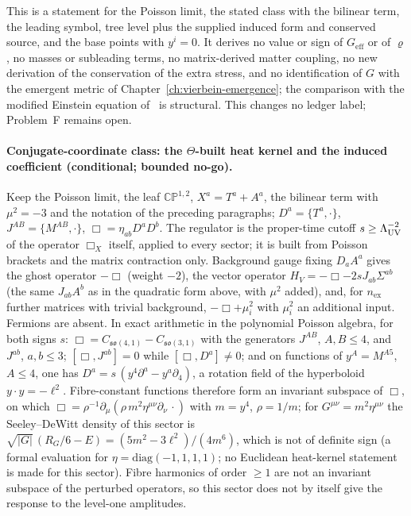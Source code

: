 This is a statement for the Poisson limit, the stated class with the bilinear term, the leading symbol, tree level plus the supplied induced form and conserved source, and the base points with \(y^i=0\). It derives no value or sign of \(G_{\mathrm{eff}}\) or of \(\varrho\), no masses or subleading terms, no matrix-derived matter coupling, no new derivation of the conservation of the extra stress, and no identification of \(G\) with the emergent metric of Chapter~\ref{ch:vierbein-emergence}; the comparison with the modified Einstein equation of~\cite{KumarSteinacker2023,Steinacker2026} is structural. This changes no ledger label; Problem~F remains open.

\paragraph{Conjugate-coordinate class: the \(\Theta\)-built heat kernel and the induced coefficient (conditional; bounded no-go).}
Keep the Poisson limit, the leaf \(\mathbb{CP}^{1,2}\), \(X^a=T^a+A^a\), the bilinear term with \(\mu^2=-3\) and the notation of the preceding paragraphs; \(D^a=\{T^a,\cdot\}\), \(J^{AB}=\{M^{AB},\cdot\}\), \(\Box=\eta_{ab}D^aD^b\). The regulator is the proper-time cutoff \(s\ge\Lambda_{\mathrm{UV}}^{-2}\) of the operator \(\Box_X\) itself, applied to every sector; it is built from Poisson brackets and the matrix contraction only. Background gauge fixing \(D_aA^a\) gives the ghost operator \(-\Box\) (weight \(-2\)), the vector operator \(H_V=-\Box-2sJ_{ab}\Sigma^{ab}\) (the same \(J_{ab}A^b\) as in the quadratic form above, with \(\mu^2\) added), and, for \(n_{\mathrm{ex}}\) further matrices with trivial background, \(-\Box+\mu_i^2\) with \(\mu_i^2\) an additional input. Fermions are absent. In exact arithmetic in the polynomial Poisson algebra, for both signs \(s\): \(\Box=C_{\mathfrak{so}(4,1)}-C_{\mathfrak{so}(3,1)}\) with the generators \(J^{AB}\), \(A,B\le4\), and \(J^{ab}\), \(a,b\le3\); \([\Box,J^{ab}]=0\) while \([\Box,D^a]\ne0\); and on functions of \(y^A=M^{A5}\), \(A\le4\), one has \(D^a=s\,(y^4\partial^a-y^a\partial_4)\), a rotation field of the hyperboloid \(y\cdot y=-\ell^2\). Fibre-constant functions therefore form an invariant subspace of \(\Box\), on which \(\Box=\rho^{-1}\partial_\mu(\rho\,m^2\eta^{\mu\nu}\partial_\nu\,\cdot)\) with \(m=y^4\), \(\rho=1/m\); for \(G^{\mu\nu}=m^2\eta^{\mu\nu}\) the Seeley--DeWitt density of this sector is \(\sqrt{|G|}\,(R_G/6-E)=(5m^2-3\ell^2)/(4m^6)\), which is not of definite sign (a formal evaluation for \(\eta=\mathrm{diag}(-1,1,1,1)\); no Euclidean heat-kernel statement is made for this sector). Fibre harmonics of order \(\ge1\) are not an invariant subspace of the perturbed operators, so this sector does not by itself give the response to the level-one amplitudes.

